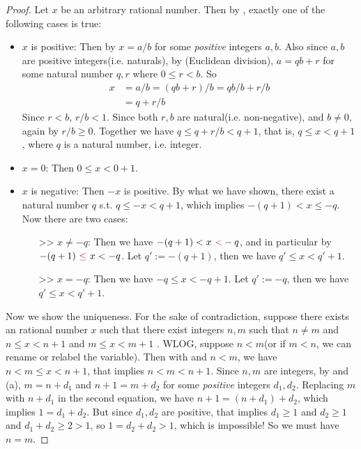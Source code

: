 \begin{proof}
Let \(x\) be an arbitrary rational number.
Then by , exactly one of the following cases is true:
\begin{itemize}
    \item \(x\) is positive:
        Then by  \(x = a/b\) for some \emph{positive} integers \(a, b\).
        Also since \(a, b\) are positive integers(i.e. naturals), by (Euclidean division), \(a = qb + r\) for some natural number \(q, r\) where \(0 \le r < b\).
        So
        \begin{align*}
            x & = a/b = (qb + r)/b = qb/b + r/b \\
              & = q + r/b
        \end{align*}
        Since \(r < b\), \(r/b < 1\).
        Since both \(r, b\) are natural(i.e. non-negative), and \(b \neq 0\), again by  \(r/b \ge 0\).
        Together we have \(q \le q + r/b < q + 1\), that is, \(q \le x < q + 1\), where \(q\) is a natural number, i.e. integer.
    \item \(x = 0\):
        Then \(0 \le x < 0 + 1\).
    \item \(x\) is negative:
        Then \(-x\) is positive.
        By what we have shown, there exist a natural number \(q\) s.t. \(q \le -x < q + 1\), which implies \(-(q + 1) < x \le -q\).
        Now there are two cases:
        \begin{itemize}
            \item[>>] \(x \neq -q\):
                Then we have \(-(q + 1) < x \MAROON{\ <} -q\), and in particular by  \(-(q + 1) \MAROON{\ \le\ } x < -q\).
                Let \(q' := -(q + 1)\), then we have \(q' \le x < q' + 1\).
            \item[>>] \(x = -q\):
                Then we have \(-q \le x < -q + 1\).
                Let \(q' := -q\), then we have \(q' \le x < q' + 1\).
        \end{itemize}
\end{itemize}

Now we show the uniqueness.
For the sake of contradiction, suppose there exists an rational number \(x\) such that there exist integers \(n, m\) such that \(n \neq m\) and \(n \le x < n + 1\)  and \(m \le x < m + 1\) .
WLOG, suppose \(n < m\)(or if \(m < n\), we can rename or relabel the variable).
Then with  and \(n < m\), we have \(n < m \le x < n + 1\), that implies \(n < m < n + 1\).
Since \(n, m\) are integers, by  and (a), \(m = n + d_1\) and \(n + 1 = m + d_2\) for some \emph{positive} integers \(d_1, d_2\).
Replacing \(m\) with \(n + d_1\) in the second equation, we have \(n + 1 = (n + d_1) + d_2\), which implies \(1 = d_1 + d_2\).
But since \(d_1, d_2\) are positive, that implies \(d_1 \ge 1\) and \(d_2 \ge 1\) and \(d_1 + d_2 \ge 2 > 1\), so \(1 = d_2 + d_2 > 1\), which is impossible!
So we must have \(n = m\).


\end{proof}

